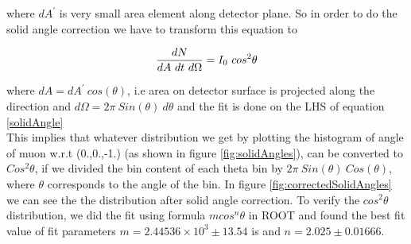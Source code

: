 \documentclass[a4paper,10pt]{article}
\begin{document}
where $dA^{'}$ is very small area element along detector plane. So in order to do the solid angle correction we have to transform this equation to 

\begin{equation}\label{solidAngle}
   \centering{\frac{dN}{dA \ dt \ d\Omega } = I_{0} \ cos^{2}\theta}  
\end{equation}

where $dA = dA^{'}\ cos(\theta)$, i.e area on detector surface is projected along the direction and $d\Omega = 2\pi  \ Sin(\theta) \ d\theta$
   and the fit is done on the LHS of equation \ref{solidAngle}\\

This implies that whatever distribution we get by plotting the histogram of angle of muon w.r.t (0.,0.,-1.) (as shown in figure \ref{fig:solidAngles}), can be converted to $Cos^2{}\theta$, if we divided the bin content of each theta bin by $2\pi \ Sin(\theta) \ Cos(\theta)$, where $\theta$ corresponds to the angle of the bin. In figure \ref{fig:correctedSolidAngles} we can see the the distribution after solid angle correction. To verify the \(cos^2\theta\) distribution, we did the fit using formula \textbf{\(m cos^n\theta\)} in ROOT and found the best fit value of fit parameters \(m = 2.44536 \times 10^3 \pm 13.54\)  is and \(n = 2.025 \pm 0.01666\).

\begin{figure}[!htb]
\end{figure}

\end{document}
